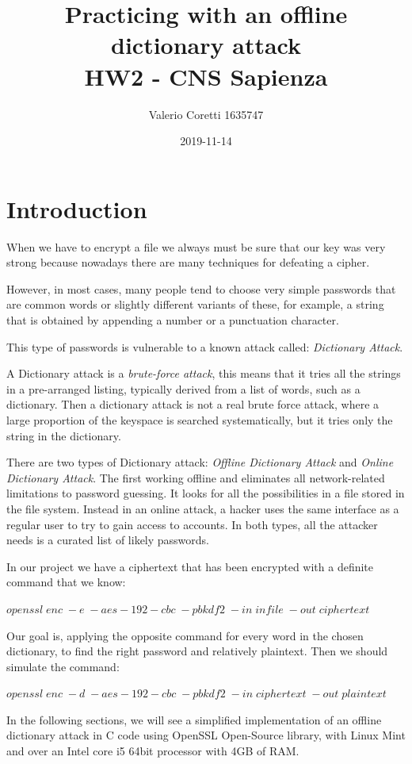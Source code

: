 \documentclass[11pt]{article}
\title{{\bf Practicing with an offline dictionary attack} \\ \bigskip \large HW2 - CNS Sapienza}
\date{2019-11-14}
\author{Valerio Coretti 1635747}
\begin{document}
\maketitle

\section{Introduction}
When we have to encrypt a file we always must be sure that our key was very strong because nowadays there are many techniques for defeating a cipher.

However, in most cases, many people tend to choose very simple passwords that are common words or slightly different variants of these, for example, a string that is obtained by appending a number or a punctuation character.

This type of passwords is vulnerable to a known attack called: {\em Dictionary Attack}.

A Dictionary attack is a {\em brute-force attack}, this means that it tries all the strings in a pre-arranged listing, typically derived from a list of words, such as a dictionary. Then a dictionary attack is not a real brute force attack, where a large proportion of the keyspace is searched systematically, but it tries only the string in the dictionary.

There are two types of Dictionary attack: {\em Offline Dictionary Attack} and {\em Online Dictionary Attack}. The first working offline and eliminates all network-related limitations to password guessing. It looks for all the possibilities in a file stored in the file system. Instead in an online attack, a hacker uses the same interface as a regular user to try to gain access to accounts. In both types, all the attacker needs is a curated list of likely passwords.

In our project we have a ciphertext that has been encrypted with a definite command that we know:

\bigskip
$ openssl\;enc\;-e\;-aes-192-cbc\;-pbkdf2\;-in\;infile\;-out\;ciphertext $
\bigskip

Our goal is, applying the opposite command for every word in the chosen dictionary, to find the right password and relatively plaintext. Then we should simulate the command:

\bigskip
$ openssl\;enc\;-d\;-aes-192-cbc\;-pbkdf2\;-in\;ciphertext\;-out\;plaintext $
\bigskip

In the following sections, we will see a simplified implementation of an offline dictionary attack in C code using OpenSSL Open-Source library, with Linux Mint and over an Intel core i5 64bit processor with 4GB of RAM.
\end{document}
